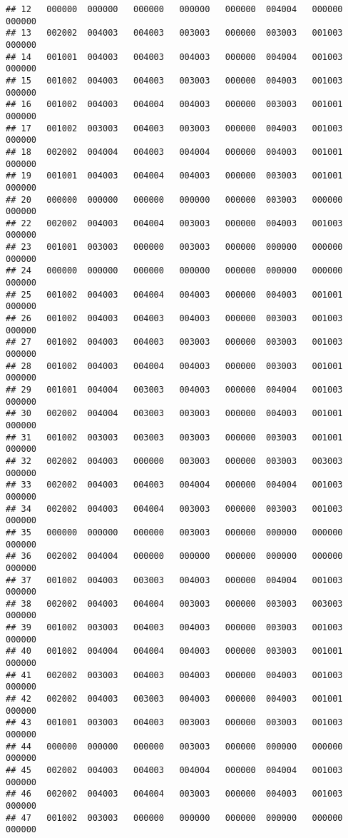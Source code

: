 \documentclass[
]{article}
\begin{document}
\begin{verbatim}
## 12   000000  000000   000000   000000   000000  004004   000000   000000
## 13   002002  004003   004003   003003   000000  003003   001003   000000
## 14   001001  004003   004003   004003   000000  004004   001003   000000
## 15   001002  004003   004003   003003   000000  004003   001003   000000
## 16   001002  004003   004004   004003   000000  003003   001001   000000
## 17   001002  003003   004003   003003   000000  004003   001003   000000
## 18   002002  004004   004003   004004   000000  004003   001001   000000
## 19   001001  004003   004004   004003   000000  003003   001001   000000
## 20   000000  000000   000000   000000   000000  003003   000000   000000
## 22   002002  004003   004004   003003   000000  004003   001003   000000
## 23   001001  003003   000000   003003   000000  000000   000000   000000
## 24   000000  000000   000000   000000   000000  000000   000000   000000
## 25   001002  004003   004004   004003   000000  004003   001001   000000
## 26   001002  004003   004003   004003   000000  003003   001003   000000
## 27   001002  004003   004003   003003   000000  003003   001003   000000
## 28   001002  004003   004004   004003   000000  003003   001001   000000
## 29   001001  004004   003003   004003   000000  004004   001003   000000
## 30   002002  004004   003003   003003   000000  004003   001001   000000
## 31   001002  003003   003003   003003   000000  003003   001001   000000
## 32   002002  004003   000000   003003   000000  003003   003003   000000
## 33   002002  004003   004003   004004   000000  004004   001003   000000
## 34   002002  004003   004004   003003   000000  003003   001003   000000
## 35   000000  000000   000000   003003   000000  000000   000000   000000
## 36   002002  004004   000000   000000   000000  000000   000000   000000
## 37   001002  004003   003003   004003   000000  004004   001003   000000
## 38   002002  004003   004004   003003   000000  003003   003003   000000
## 39   001002  003003   004003   004003   000000  003003   001003   000000
## 40   001002  004004   004004   004003   000000  003003   001001   000000
## 41   002002  003003   004003   004003   000000  004003   001003   000000
## 42   002002  004003   003003   004003   000000  004003   001001   000000
## 43   001001  003003   004003   003003   000000  003003   001003   000000
## 44   000000  000000   000000   003003   000000  000000   000000   000000
## 45   002002  004003   004003   004004   000000  004004   001003   000000
## 46   002002  004003   004004   003003   000000  004003   001003   000000
## 47   001002  003003   000000   000000   000000  000000   000000   000000

\end{verbatim}
\end{document}
